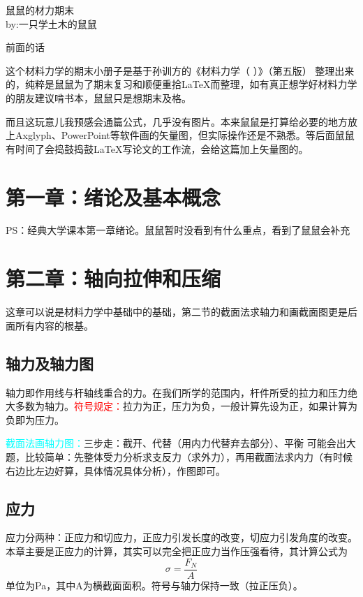 \documentclass[10pt,a4paper]{ctexart}
\begin{document}
	\begin{titlepage}
\centering
{}鼠鼠的材力期末\protect\footnotemark%
\\
\vspace*{\baselineskip}
by:一只学土木的鼠鼠
	\newpage
	\end{titlepage}
 \noindent%
 前面的话

\vspace*{1ex}%
这个材料力学的期末小册子是基于孙训方的《材料力学（\uppercase\expandafter{}%
 ）》（第五版）\cite{孙训方2009}
 整理出来的，纯粹是鼠鼠为了期末复习和顺便重拾\LaTeX 而整理，如有真正想学好材料力学的朋友建议啃书本，鼠鼠只是想期末及格。
 
 而且这玩意儿我预感会通篇公式，几乎没有图片。本来鼠鼠是打算给必要的地方放上Axglyph、PowerPoint等软件画的矢量图，但实际操作还是不熟悉。等后面鼠鼠有时间了会捣鼓捣鼓\LaTeX 写论文的工作流，会给这篇加上矢量图的。
\thispagestyle{empty}%
 \newpage
\tableofcontents
\setcounter{page}{0}%
\thispagestyle{empty}
\newpage
\setcounter{secnumdepth}{-1}%
\section{第一章：绪论及基本概念}
PS：经典大学课本第一章绪论。鼠鼠暂时没看到有什么重点，看到了鼠鼠会补充
\section{第二章：轴向拉伸和压缩}
这章可以说是材料力学中基础中的基础，第二节的截面法求轴力和画截面图更是后面所有内容的根基。
\subsection{轴力及轴力图}
轴力即作用线与杆轴线重合的力。在我们所学的范围内，杆件所受的拉力和压力绝大多数为轴力。\textcolor{red}{符号规定：}拉力为正，压力为负，一般计算先设为正，如果计算为负即为压力。

\textcolor{cyan}{截面法画轴力图：}三步走：截开、代替（用内力代替弃去部分）、平衡
可能会出大题，比较简单：先整体受力分析求支反力（求外力），再用截面法求内力（有时候右边比左边好算，具体情况具体分析），作图即可。
\subsection{应力}
应力分两种：正应力和切应力，正应力引发长度的改变，切应力引发角度的改变。本章主要是正应力的计算，其实可以完全把正应力当作压强看待，其计算公式为
\begin{equation}
	\sigma=\frac{F_N}{A}
	\label{zyl}
\end{equation}
单位为Pa，其中A为横截面面积。符号与轴力保持一致（拉正压负）。
\end{document}
